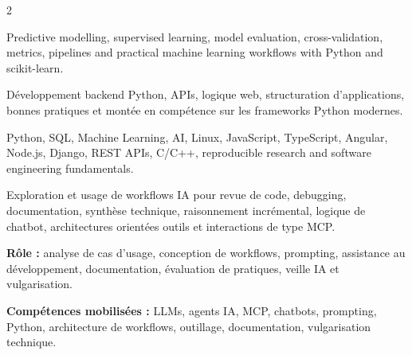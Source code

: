\documentclass[8pt,a4paper,ragged2e,withhyper]{altacv}
\begin{document}
\begin{paracol}{2}


\small{
Predictive modelling, supervised learning, model evaluation, cross-validation, metrics, pipelines and practical machine learning workflows with Python and scikit-learn.
}

\divider


\divider


\small{
Développement backend Python, APIs, logique web, structuration d’applications, bonnes pratiques et montée en compétence sur les frameworks Python modernes.
}

\divider


\small{
Python, SQL, Machine Learning, AI, Linux, JavaScript, TypeScript, Angular, Node.js, Django, REST APIs, C/C++, reproducible research and software engineering fundamentals.
}

\end{paracol}



Exploration et usage de workflows IA pour revue de code, debugging, documentation, synthèse technique, raisonnement incrémental, logique de chatbot, architectures orientées outils et interactions de type MCP.

\textbf{Rôle :} analyse de cas d’usage, conception de workflows, prompting, assistance au développement, documentation, évaluation de pratiques, veille IA et vulgarisation.

\textbf{Compétences mobilisées :} LLMs, agents IA, MCP, chatbots, prompting, Python, architecture de workflows, outillage, documentation, vulgarisation technique.

\divider

\end{document}
